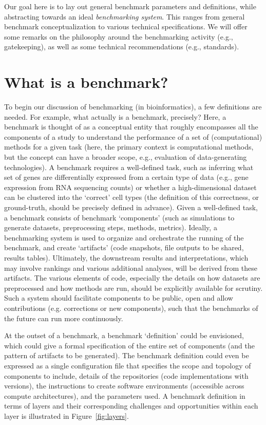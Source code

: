 \documentclass[11pt]{article}
\begin{document}
Our goal here is to lay out general benchmark parameters and definitions, while abstracting towards an ideal \textit{benchmarking system}. This ranges from general benchmark conceptualization to various technical specifications. We will offer some remarks on the philosophy around the benchmarking activity (e.g., gatekeeping), as well as some technical recommendations (e.g., standards).


\section{What is a benchmark?}

To begin our discussion of benchmarking (in bioinformatics), a few definitions are needed. For example, what actually is a benchmark, precisely? Here, a benchmark is thought of as a conceptual entity that roughly encompasses all the components of a study to understand the performance of a set of (computational) methods for a given task (here, the primary context is computational methods, but the concept can have a broader scope, e.g., evaluation of data-generating technologies). A benchmark requires a well-defined task, such as inferring what set of genes are differentially expressed from a certain type of data (e.g., gene expression from RNA sequencing counts) or whether a high-dimensional dataset can be clustered into the `correct' cell types (the definition of this correctness, or ground-truth, should be precisely defined in advance). Given a well-defined task, a benchmark consists of benchmark `components' (such as simulations to generate datasets, preprocessing steps, methods, metrics). Ideally, a benchmarking system is used to organize and orchestrate the running of the benchmark, and create `artifacts' (code snapshots, file outputs to be shared, results tables). Ultimately, the downstream results and interpretations, which may involve rankings and various additional analyses, will be derived from these artifacts. The various elements of code, especially the details on how datasets are preprocessed and how methods are run, should be explicitly available for scrutiny. Such a system should facilitate components to be public, open and allow contributions (e.g. corrections or new components), such that the benchmarks of the future can run more continuously.

At the outset of a benchmark, a benchmark `definition' could be envisioned, which could give a formal specification of the entire set of components (and the pattern of artifacts to be generated). The benchmark definition could even be expressed as a single configuration file that specifies the scope and topology of components to include, details of the repositories (code implementations with versions), the instructions to create software environments (accessible across compute architectures), and the parameters used. A benchmark definition in terms of layers and their corresponding challenges and opportunities within each layer is illustrated in Figure~\ref{fig:layers}.
\end{document}
